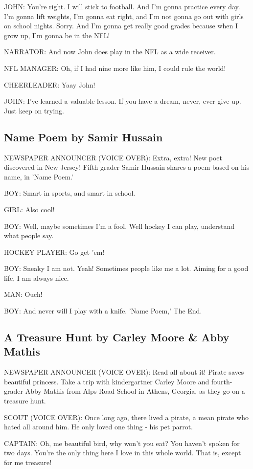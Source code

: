 JOHN:
You're right.
I will stick to football.
And I'm gonna practice every day.
I'm gonna lift weights, I'm gonna eat right, and I'm not gonna go out with girls on school nights.
Sorry.
And I'm gonna get really good grades because when I grow up, I'm gonna be in the NFL!

NARRATOR:
And now John does play in the NFL as a wide receiver.

NFL MANAGER:
Oh, if I had nine more like him, I could rule the world!

CHEERLEADER:
Yaay John!

JOHN:
I've learned a valuable lesson.
If you have a dream, never, ever give up.
Just keep on trying.

\subsection{Name Poem by Samir Hussain}

NEWSPAPER ANNOUNCER (VOICE OVER):
Extra, extra!
New poet discovered in New Jersey!
Fifth-grader Samir Hussain shares a poem based on his name, in 'Name Poem.'

BOY:
Smart in sports, and smart in school.

GIRL:
Also cool!

BOY:
Well, maybe sometimes I'm a fool.
Well hockey I can play, understand what people say.

HOCKEY PLAYER:
Go get 'em!

BOY:
Sneaky I am not.
Yeah!
Sometimes people like me a lot.
Aiming for a good life, I am always nice.

MAN:
Ouch!

BOY:
And never will I play with a knife.
'Name Poem,' The End.

\subsection{A Treasure Hunt by Carley Moore \& Abby Mathis}

NEWSPAPER ANNOUNCER (VOICE OVER):
Read all about it!
Pirate saves beautiful princess.
Take a trip with kindergartner Carley Moore and fourth-grader Abby Mathis from Alps Road School in Athens, Georgia, as they go on a treasure hunt.

SCOUT (VOICE OVER):
Once long ago, there lived a pirate, a mean pirate who hated all around him.
He only loved one thing - his pet parrot.

CAPTAIN:
Oh, me beautiful bird, why won't you eat?
You haven't spoken for two days.
You're the only thing here I love in this whole world.
That is, except for me treasure!

